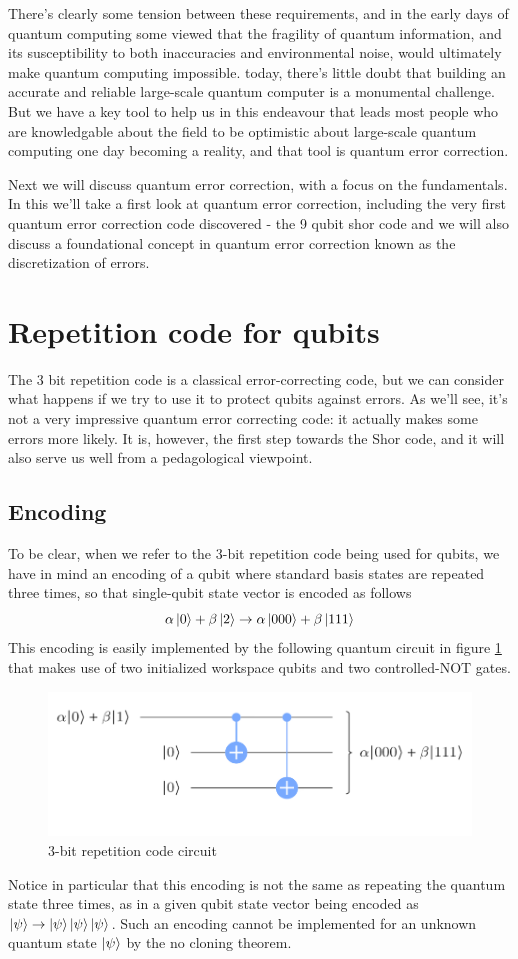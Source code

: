 \documentclass[12pt, oneside]{book}
\theoremstyle{definition}
\theoremstyle{definition}
\theoremstyle{remark}
\begin{document}
There's clearly some tension between these requirements, and in the early days of quantum computing some viewed that the fragility of quantum information, and its susceptibility to both inaccuracies and environmental noise, would ultimately make quantum computing impossible. today, there's little doubt that building an accurate and reliable large-scale quantum computer is a monumental challenge. But we have a key tool to help us in this endeavour that leads most people who are knowledgable about the field to be optimistic about large-scale quantum computing one day becoming a reality, and that tool is quantum error correction.

Next we will discuss quantum error correction, with a focus on the fundamentals. In this we'll take a first look at quantum error correction, including the very first quantum error correction code discovered - the 9 qubit shor code and we will also discuss a foundational concept in quantum error correction known as the discretization of errors.

\section{Repetition code for qubits}
The $3$ bit repetition code is a classical error-correcting code, but we can consider what happens if we try to use it to protect qubits against errors. As we'll see, it's not a very impressive quantum error correcting code: it actually makes some errors more likely. It is, however, the first step towards the Shor code, and it will also serve us well from a pedagological viewpoint.

\subsection{Encoding}
To be clear, when we refer to the $3$-bit repetition code being used for qubits, we have in mind an encoding of a qubit where standard basis states are repeated three times, so that single-qubit state vector is encoded as follows
\[
\alpha\ket{0}+\beta\ket{2}\rightarrow \alpha\ket{000}+\beta\ket{111}
\]
This encoding is easily implemented by the following quantum circuit in figure \ref{fig:3bitrepcirc} that makes use of two initialized workspace qubits and two controlled-NOT gates.
\begin{figure}[ht]
    \centering
    \includegraphics[width=0.75\linewidth]{../images/bitflipprep.png}
    \caption{3-bit repetition code circuit}
    \label{fig:3bitrepcirc}
\end{figure}
Notice in particular that this encoding is not the same as repeating the quantum state three times, as in a given qubit state vector being encoded as $\ket{\psi}\rightarrow \ket{\psi}\ket{\psi}\ket{\psi}$. Such an encoding cannot be implemented for an unknown quantum state $\ket{\psi}$ by the no cloning theorem.
\end{document}

